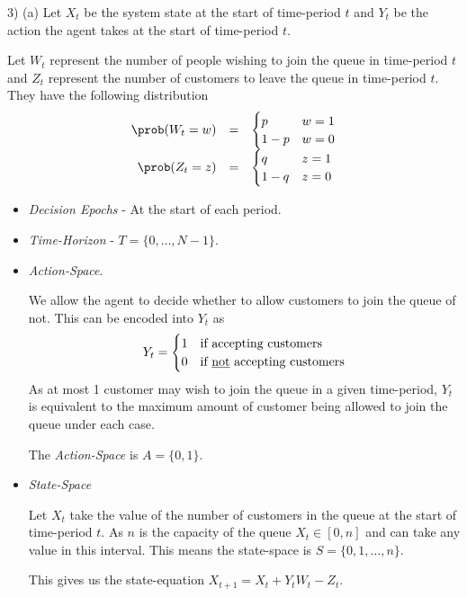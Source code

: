 \documentclass[11pt,a4paper]{article}
\begin{document}
\begin{answer}{3) (a)}
  Let $X_t$ be the system state at the start of time-period $t$ and $Y_t$ be the action the agent takes at the start of time-period $t$.
  \par Let $W_t$ represent the number of people wishing to join the queue in time-period $t$ and $Z_t$ represent the number of customers to leave the queue in time-period $t$. They have the following distribution
  \[\begin{array}{rcl}
    \prob(W_t=w)&=&\begin{cases}
      p&w=1\\
      1-p&w=0
    \end{cases}\\
    \prob(Z_t=z)&=&\begin{cases}
      q&z=1\\
      1-q&z=0
    \end{cases}
  \end{array}\]
  \begin{itemize}

    \item \textit{Decision Epochs} - At the start of each period.

    \item \textit{Time-Horizon} - $T=\{0,\dots,N-1\}$.

    \item \textit{Action-Space}.
    \par We allow the agent to decide whether to allow customers to join the queue of not. This can be encoded into $Y_t$ as
    \[ Y_t=\begin{cases}
      1&\text{if accepting customers}\\
      0&\text{if \underline{not} accepting customers}
    \end{cases} \]
    As at most 1 customer may wish to join the queue in a given time-period, $Y_t$ is equivalent to the maximum amount of customer being allowed to join the queue under each case.
    \par The \textit{Action-Space} is $A=\{0,1\}$.

    \item \textit{State-Space}
    \par Let $X_t$ take the value of the number of customers in the queue at the start of time-period $t$. As $n$ is the capacity of the queue $X_t\in[0,n]$ and can take any value in this interval. This means the state-space is $S=\{0,1,\dots,n\}$.
    \par This gives us the state-equation $X_{t+1}=X_t+Y_tW_t-Z_t$.


\end{itemize}
\end{answer}
\end{document}
